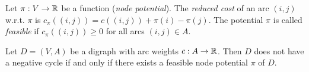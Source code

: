 



  
  
  


Let $\pi : V  \to \mathbb{R}$ be a function (\emph{node potential}). The
\emph{reduced cost} of an arc $(i,j)$ w.r.t. $\pi$ is 
$c_\pi((i,j))=c((i,j))+\pi(i) - \pi(j)$. The potential $\pi$ is called
\emph{feasible} if $c_\pi((i,j))\geq0$ for all arcs $(i,j)\in A$. 

\begin{lemma}
  \label{lem:7}
  Let $D = (V,A)$ be a digraph with arc weights $c:A\to\mathbb{R}$. Then $D$
  does not have a negative cycle if and only if there exists a
  feasible node potential $\pi$ of $D$. 
\end{lemma}



